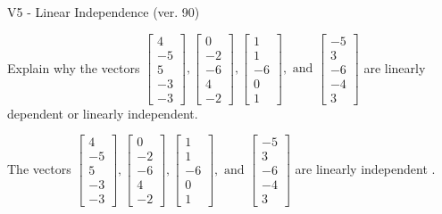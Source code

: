 \begin{exercise}
  \begin{exerciseTitle}V5 - Linear Independence (ver. 90)\end{exerciseTitle}
  \begin{exerciseStatement}
    Explain why the vectors \(\left[\begin{array}{r}
4 \\
-5 \\
5 \\
-3 \\
-3
\end{array}\right] , \left[\begin{array}{r}
0 \\
-2 \\
-6 \\
4 \\
-2
\end{array}\right] , \left[\begin{array}{r}
1 \\
1 \\
-6 \\
0 \\
1
\end{array}\right] , \text{ and } \left[\begin{array}{r}
-5 \\
3 \\
-6 \\
-4 \\
3
\end{array}\right]\) are linearly dependent or linearly independent.	


  \end{exerciseStatement}
  \begin{exerciseAnswer}
   The vectors \(\left[\begin{array}{r}
4 \\
-5 \\
5 \\
-3 \\
-3
\end{array}\right] , \left[\begin{array}{r}
0 \\
-2 \\
-6 \\
4 \\
-2
\end{array}\right] , \left[\begin{array}{r}
1 \\
1 \\
-6 \\
0 \\
1
\end{array}\right] , \text{ and } \left[\begin{array}{r}
-5 \\
3 \\
-6 \\
-4 \\
3
\end{array}\right]\) are 
  	 linearly independent  .
  


  \end{exerciseAnswer}
\end{exercise}